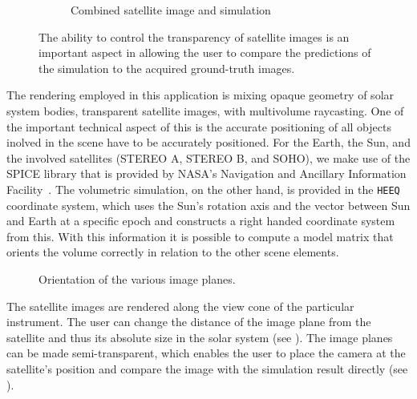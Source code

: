 \begin{figure}
\begin{subfigure}[b]{0.32\textwidth}
    \caption{Combined satellite image and simulation}
    \label{contributions:astro:spaceweather:velocity:coronagraph:coronagraph_simulation}
\end{subfigure}
\caption{The ability to control the transparency of satellite images is an important aspect in allowing the user to compare the predictions of the simulation to the acquired ground-truth images.}
\label{contributions:astro:spaceweather:rendering:coronagraph}
\end{figure}

The rendering employed in this application is mixing opaque geometry of solar system bodies, transparent satellite images, with multivolume raycasting.  One of the important technical aspect of this is the accurate positioning of all objects inolved in the scene have to be accurately positioned.  For the Earth, the Sun, and the involved satellites (STEREO A, STEREO B, and SOHO), we make use of the SPICE library that is provided by NASA's Navigation and Ancillary Information Facility~\cite{acton1996ancillary}.  The volumetric simulation, on the other hand, is provided in the \texttt{HEEQ} coordinate system, which uses the Sun's rotation axis and the vector between Sun and Earth at a specific epoch and constructs a right handed coordinate system from this.  With this information it is possible to compute a model matrix that orients the volume correctly in relation to the other scene elements.

\begin{figure}
\centering
{}
\caption{Orientation of the various image planes.}
\label{contributions:astro:spacewather:rendering:planes}
\end{figure}

The satellite images are rendered along the view cone of the particular instrument.  The user can change the distance of the image plane from the satellite and thus its absolute size in the solar system (see ).  The image planes can be made semi-transparent, which enables the user to place the camera at the satellite's position and compare the image with the simulation result directly (see ).

